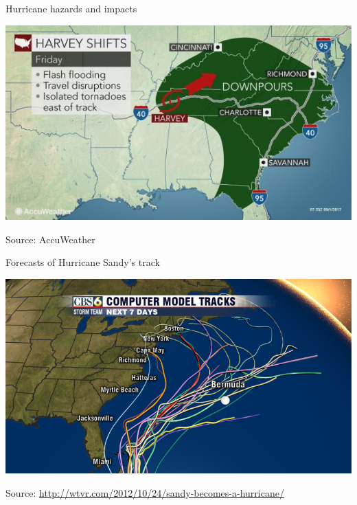 \documentclass[ignorenonframetext,]{beamer}
\begin{document}
\begin{frame}{Hurricane hazards and impacts}

\begin{center}\includegraphics[width=\textwidth]{harvey_inland} \end{center}

\footnotesize

Source: AccuWeather

\end{frame}

\begin{frame}{Forecasts of Hurricane Sandy's track}

\begin{center}\includegraphics[width=\textwidth]{sandy_spaghetti} \end{center}

\vspace{-0.2cm}

\footnotesize 

Source: \url{http://wtvr.com/2012/10/24/sandy-becomes-a-hurricane/}

\end{frame}
\end{document}
